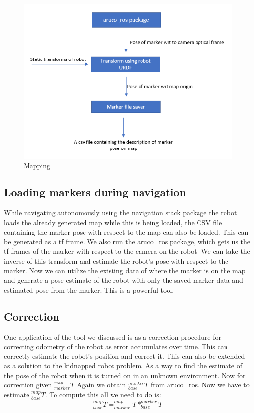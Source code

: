 \documentclass[12pt]{article}
\begin{document}
\begin{figure}[H]
\centering
\includegraphics[scale=1]{1markermapping.PNG}
\caption{Mapping}
\end{figure}

\subsection{Loading markers during navigation}
While navigating autonomously using the navigation stack package the robot loads the already generated map while this is being loaded, the CSV file containing the marker pose with respect to the map can also be loaded. This can be generated as a tf frame. We also run the aruco\_ros package, which gets us the tf frames of the marker with respect to the camera on the robot. We can take the inverse of this transform and estimate the robot's pose with respect to the marker. Now we can utilize the existing data of where the marker is on the map and generate a pose estimate of the robot with only the saved marker data and estimated pose from the marker. This is a powerful tool. 

\subsection{Correction}
One application of the tool we discussed is as a correction procedure for correcting odometry of the robot as error accumulates over time. This can correctly estimate the robot's position and correct it. This can also be extended as a solution to the kidnapped robot problem. As a way to find the estimate of the pose of the robot when it is turned on in an unknown environment.
Now for correction given $ ^{map}_{marker}T $ Again we obtain $ ^{marker}_{base}T $ from aruco\_ros. Now we have to estimate $ ^{map}_{base}T $. To compute this all we need to do is:
\begin{equation}
    ^{map}_{base}T = ^{map}_{marker}T*^{marker}_{base}T
\end{equation}
\end{document}
